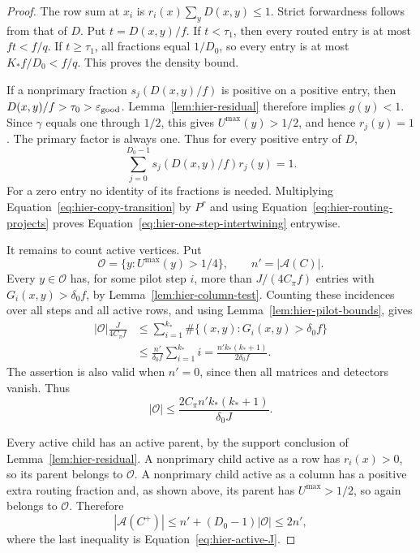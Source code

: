 \begin{proof}
The row sum at $x_i$ is $r_i(x)\sum_yD(x,y)\leq1$.  Strict
forwardness follows from that of $D$.  Put $t=D(x,y)/f$.  If
$t<\tau_1$, then every routed entry is at most $ft<f/q$.  If
$t\geq\tau_1$, all fractions equal $1/D_0$, so every entry is at
most $K_*f/D_0<f/q$.  This proves the density bound.

If a nonprimary fraction $s_j(D(x,y)/f)$ is positive on a positive
entry, then $D(x,y)/f>\tau_0>\varepsilon_{\rm good}$.
Lemma~\ref{lem:hier-residual} therefore implies $g(y)<1$.
Since $\gamma$ equals one through $1/2$, this gives
$U^{\max}(y)>1/2$, and hence $r_j(y)=1$.  The primary factor is
always one.  Thus for every positive entry of $D$,
\begin{equation}
 \sum_{j=0}^{D_0-1}s_j(D(x,y)/f)r_j(y)=1.
 \label{eq:hier-routing-projects}
\end{equation}
For a zero entry no identity of its fractions is needed.  Multiplying
Equation~\eqref{eq:hier-copy-transition} by $P^r$ and using
Equation~\eqref{eq:hier-routing-projects} proves
Equation~\eqref{eq:hier-one-step-intertwining} entrywise.

It remains to count active vertices.  Put
\[
 \mathcal O=\{y:U^{\max}(y)>1/4\},\qquad
 n'=|\mathcal A(C)|.
\]
Every $y\in\mathcal O$ has, for some pilot step $i$, more than
$J/(4C_\pi f)$ entries with $G_i(x,y)>\delta_0f$, by
Lemma~\ref{lem:hier-column-test}.  Counting these incidences over all
steps and all active rows, and using
Lemma~\ref{lem:hier-pilot-bounds}, gives
\begin{align*}
 |\mathcal O|\frac{J}{4C_\pi f}
 &\leq\sum_{i=1}^{k_*}\#\{(x,y):G_i(x,y)>\delta_0f\}\\
 &\leq\frac{n'}{\delta_0f}\sum_{i=1}^{k_*}i
   =\frac{n'k_*(k_*+1)}{2\delta_0f}.
\end{align*}
The assertion is also valid when $n'=0$, since then all matrices and
detectors vanish.  Thus
\[
 |\mathcal O|\leq
       \frac{2C_\pi n'k_*(k_*+1)}{\delta_0J}.
\]

Every active child has an active parent, by the support conclusion of
Lemma~\ref{lem:hier-residual}.  A nonprimary child active as a row has
$r_i(x)>0$, so its parent belongs to $\mathcal O$.  A nonprimary
child active as a column has a positive extra routing fraction and, as
shown above, its parent has $U^{\max}>1/2$, so again belongs to
$\mathcal O$.  Therefore
\[
 |\mathcal A(C^+)|\leq n'+(D_0-1)|\mathcal O|\leq2n',
\]
where the last inequality is Equation~\eqref{eq:hier-active-J}.
\end{proof}

